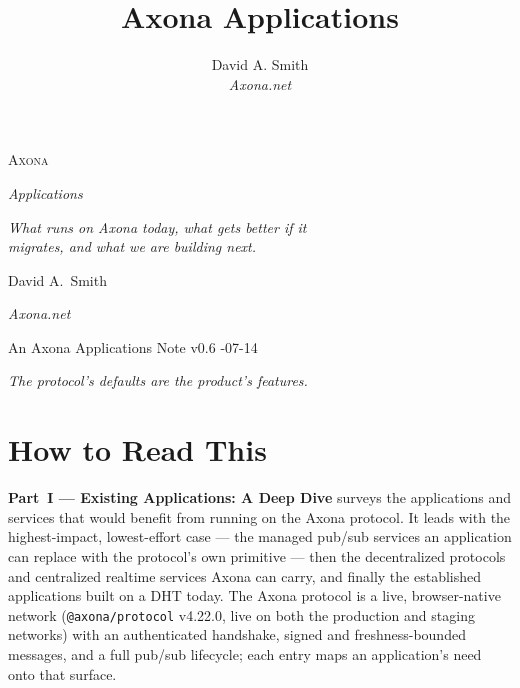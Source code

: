 \documentclass[nobib]{tufte-handout}
\title{Axona Applications}
\author[David A. Smith]{David A. Smith \\[0.3em] \emph{\small Axona.net}}
\date{}
\begin{document}

\thispagestyle{empty}
\null\vfill
\begin{center}
{\fontsize{48}{52}\selectfont \textsc{Axona}\par}
\vspace{0.4em}
{\Large\itshape Applications\par}
\vspace{3.5em}
{\large\itshape What runs on Axona today, what gets better if it\\
migrates, and what we are building next.\par}
\vspace{4em}
{\large David A.~Smith\par}
{\itshape\small Axona.net\par}
\vspace{2em}
{\small An Axona Applications Note \quad v0.6 -07-14\par}
\end{center}
\vfill
\null
\newpage

\thispagestyle{empty}
\null\vfill
\begin{flushright}
\itshape The protocol's defaults are the product's features.\par
\end{flushright}
\vfill
\null\newpage

\pagestyle{axonaplain}
\thispagestyle{axonaplain}

\section*{How to Read This}


\textbf{Part~I --- Existing Applications: A Deep Dive} surveys the
applications and services that would benefit from running on the Axona
protocol. It leads with the highest-impact, lowest-effort case --- the
managed pub/sub services an application can replace with the protocol's
own primitive --- then the decentralized protocols and centralized
realtime services Axona can carry, and finally the established
applications built on a DHT today. The Axona protocol is a live,
browser-native network (\texttt{@axona/protocol} v4.22.0, live on both the
production and staging networks) with an
authenticated handshake, signed and freshness-bounded messages, and a
full pub/sub lifecycle; each entry maps an application's need onto that
surface.
\end{document}
